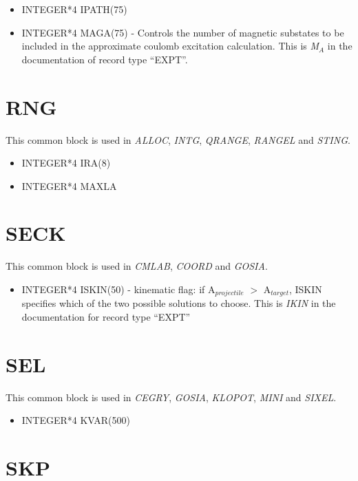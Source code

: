 \begin{itemize}
\item INTEGER*4 IPATH(75)
\item INTEGER*4 MAGA(75) - Controls the number of magnetic substates to be
included in the approximate coulomb excitation calculation. This is {\em
M$_A$} in the documentation of record type ``EXPT''.
\end{itemize}

\section{RNG}

This common block is used in {\em ALLOC}, {\em INTG}, {\em QRANGE}, {\em
RANGEL} and {\em STING}.

\begin{itemize}
\item INTEGER*4 IRA(8)
\item INTEGER*4 MAXLA
\end{itemize}

\section{SECK}

This common block is used in {\em CMLAB}, {\em COORD} and {\em GOSIA}.

\begin{itemize}
\item INTEGER*4 ISKIN(50) - kinematic flag: if A$_{projectile}$ $>$
A$_{target}$, ISKIN specifies which of the two possible solutions to choose.
This is {\em IKIN} in the documentation for record type ``EXPT''
\end{itemize}

\section{SEL}

This common block is used in {\em CEGRY}, {\em GOSIA}, {\em KLOPOT}, {\em
MINI} and {\em SIXEL}.

\begin{itemize}
\item INTEGER*4 KVAR(500)
\end{itemize}

\section{SKP}

